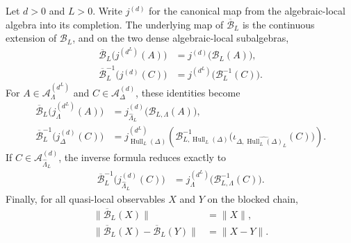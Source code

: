 \begin{lemma}
    \label{lem:qca_quasi_local_blocking_formulas}
    \leanok
    Let $d>0$ and $L>0$.  Write $j^{(d)}$ for the canonical map from the
    algebraic-local algebra into its completion.  The underlying map of
    $\overline{\mathcal B}_L$ is the continuous extension of $\mathcal B_L$,
    and on the two dense algebraic-local subalgebras,
    \begin{align}
        \overline{\mathcal B}_L\bigl(j^{(d^L)}(A)\bigr)
         & =j^{(d)}\bigl(\mathcal B_L(A)\bigr),
        \label{eq:qca_blocking_dense_fwd}              \\
        \overline{\mathcal B}_L^{-1}\bigl(j^{(d)}(C)\bigr)
         & =j^{(d^L)}\bigl(\mathcal B_L^{-1}(C)\bigr).
        \label{eq:qca_blocking_dense_rev}
    \end{align}
    For $A\in\mathcal A^{(d^L)}_\Lambda$ and
    $C\in\mathcal A^{(d)}_\Delta$, these identities become
    \begin{align}
        \overline{\mathcal B}_L\bigl(j^{(d^L)}_\Lambda(A)\bigr)
         & =j^{(d)}_{\widehat\Lambda_L}
        \bigl(\mathcal B_{L,\Lambda}(A)\bigr),
        \label{eq:qca_blocking_fin_fwd}               \\
        \overline{\mathcal B}_L^{-1}\bigl(j^{(d)}_\Delta(C)\bigr)
         & =j^{(d^L)}_{\operatorname{Hull}_L(\Delta)}
        \left(\mathcal B^{-1}_{L,\operatorname{Hull}_L(\Delta)}
        \bigl(\iota_{\Delta,
                    \widehat{\operatorname{Hull}_L(\Delta)}_L}(C)\bigr)\right).
        \label{eq:qca_blocking_fin_rev}
    \end{align}
    If $C\in\mathcal A^{(d)}_{\widehat\Lambda_L}$, the inverse formula reduces
    exactly to
    \begin{align}
        \overline{\mathcal B}_L^{-1}
        \bigl(j^{(d)}_{\widehat\Lambda_L}(C)\bigr)
         & =j^{(d^L)}_\Lambda\bigl(\mathcal B_{L,\Lambda}^{-1}(C)\bigr).
        \label{eq:qca_blocking_fin_exact}
    \end{align}
    Finally, for all quasi-local observables $X$ and $Y$ on the blocked chain,
    \begin{align}
        \lVert\overline{\mathcal B}_L(X)\rVert & =\lVert X\rVert,
        \label{eq:qca_blocking_norm}                                \\
        \lVert\overline{\mathcal B}_L(X)-
        \overline{\mathcal B}_L(Y)\rVert       & =\lVert X-Y\rVert.
        \label{eq:qca_blocking_dist}
    \end{align}
\end{lemma}

